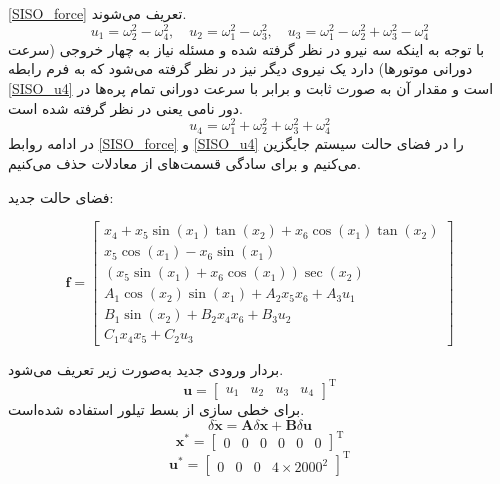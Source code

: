 \ref{SISO_force}
تعریف می‌شوند.
\begin{equation}\label{SISO_force}
	u_1 = \omega_2^2 - \omega_4^2, \quad
	u_2 = \omega_1^2 - \omega_3^2, \quad
	u_3 = \omega_1^2 - \omega_2^2  + \omega_3^2 - \omega_4^2
\end{equation}
با توجه به اینکه سه نیرو در نظر گرفته ‌شده و مسئله نیاز به چهار خروجی (سرعت دورانی موتورها) دارد یک نیروی دیگر نیز در نظر گرفته ‌می‌شود که به فرم رابطه 
\ref{SISO_u4}
است و مقدار آن به صورت ثابت و برابر با سرعت دورانی تمام پره‌ها در دور نامی یعنی
در نظر گرفته ‌شده ‌است.
\begin{equation}\label{SISO_u4}
	u_4 = \omega_1^2 + \omega_2^2  + \omega_3^2 + \omega_4^2
\end{equation}
در ادامه روابط 
\ref{SISO_force}
و
\ref{SISO_u4}
را در فضای حالت سیستم جایگزین می‌کنیم و برای سادگی قسمت‌های 
از معادلات حذف می‌کنیم.

فضای حالت جدید:

\begin{equation}
	\boldsymbol f = \begin{bmatrix}
		x_4 + x_5\sin(x_1)\tan(x_2) + x_6\cos(x_1)\tan(x_2)\\
		x_5\cos(x_1)- x_6\sin(x_1)\\
		(x_5\sin(x_1) + x_6\cos(x_1))\sec(x_2)\\
		A_1\cos(x_2)\sin(x_1) + 
		A_2x_5x_6 + A_3u_1
		\\
		B_1\sin(x_2) + 
		B_2x_4x_6 + B_3u_2\\
		C_1x_4x_5 + 
		C_2u_3
	\end{bmatrix}
\end{equation} 

بردار ورودی جدید به‌صورت زیر تعریف می‌شود.
\begin{equation}
	\boldsymbol{u} = \begin{bmatrix}
		u_1&u_2&u_3&u_4
	\end{bmatrix}^\mathrm{T}
\end{equation}
برای خطی سازی از بسط تیلور استفاده شده‌است.
\begin{equation}
	\delta \dot{\boldsymbol{x}} = \boldsymbol{A}\delta \boldsymbol x + \boldsymbol{B}\delta \boldsymbol u 
\end{equation}
\begin{equation}
	\boldsymbol{x^*} = \begin{bmatrix} %
		0& 0 & 0 & 0& 0& 0
	\end{bmatrix}^\mathrm{T}
\end{equation}
\begin{equation}
	\boldsymbol{u^*} = \begin{bmatrix}
		0&0&0&4\times2000^2
	\end{bmatrix}^\mathrm{T}
\end{equation}

